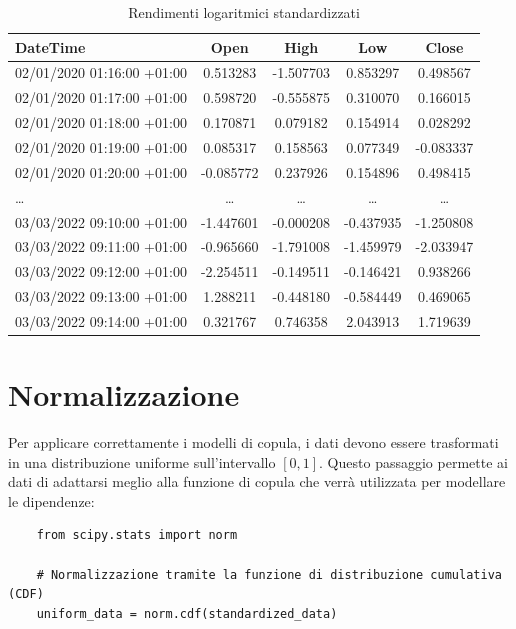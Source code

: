 \documentclass[%
	corpo=11pt,
    twoside,
    stile=classica,
    oldstyle,
    tipotesi=custom,
    greek,
    evenboxes,
]{toptesi}
\begin{document}
\begin{table}[h]
	\centering
	\renewcommand{\arraystretch}{1.2} %
	\setlength{\tabcolsep}{6pt} %
	\small %
	\begin{tabular}{lcccc} %
		\toprule
		\textbf{DateTime} & \textbf{Open} & \textbf{High} & \textbf{Low} & \textbf{Close} \\
		\midrule
		02/01/2020 01:16:00 +01:00 & 0.513283 & -1.507703 & 0.853297 & 0.498567 \\
		02/01/2020 01:17:00 +01:00 & 0.598720 & -0.555875 & 0.310070 & 0.166015 \\
		02/01/2020 01:18:00 +01:00 & 0.170871 & 0.079182 & 0.154914 & 0.028292 \\
		02/01/2020 01:19:00 +01:00 & 0.085317 & 0.158563 & 0.077349 & -0.083337 \\
		02/01/2020 01:20:00 +01:00 & -0.085772 & 0.237926 & 0.154896 & 0.498415 \\
		\midrule
		\dots & \dots & \dots & \dots & \dots \\
		\midrule
		03/03/2022 09:10:00 +01:00 & -1.447601 & -0.000208 & -0.437935 & -1.250808 \\
		03/03/2022 09:11:00 +01:00 & -0.965660 & -1.791008 & -1.459979 & -2.033947 \\
		03/03/2022 09:12:00 +01:00 & -2.254511 & -0.149511 & -0.146421 & 0.938266 \\
		03/03/2022 09:13:00 +01:00 & 1.288211 & -0.448180 & -0.584449 & 0.469065 \\
		03/03/2022 09:14:00 +01:00 & 0.321767 & 0.746358 & 2.043913 & 1.719639 \\
		\bottomrule
	\end{tabular}
	\caption{Rendimenti logaritmici standardizzati}
	\label{tab:dati_finanziari_modificati}
\end{table}

\newpage
\section{Normalizzazione}

Per applicare correttamente i modelli di copula, i dati devono essere trasformati in una distribuzione uniforme sull’intervallo \([0,1]\). Questo passaggio permette ai dati di adattarsi meglio alla funzione di copula che verrà utilizzata per modellare le dipendenze:

\begin{verbatim}
	from scipy.stats import norm
	
	# Normalizzazione tramite la funzione di distribuzione cumulativa (CDF)
	uniform_data = norm.cdf(standardized_data)
\end{verbatim}
\end{document}
